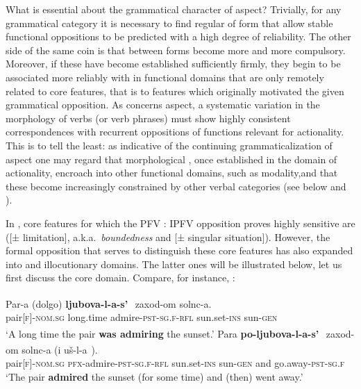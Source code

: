 \documentclass[output=paper]{langsci/langscibook}
\begin{document}
What is essential about the grammatical character of aspect? Trivially, for any grammatical category it is necessary to find regular  of form that allow stable functional oppositions to be predicted with a high degree of reliability. The other side of the same coin is that  between forms become more and more compulsory. Moreover, if these  have become established sufficiently firmly, they begin to be associated more reliably with  in functional domains that are only remotely related to core features, that is to features which originally motivated the given grammatical opposition. As concerns aspect, a systematic variation in the morphology of verbs (or verb phrases) must show highly consistent correspondences with recurrent oppositions of functions relevant for actionality. This is to tell the least: as indicative of the continuing grammaticalization of aspect  one may regard that morphological , once established in the domain of actionality, encroach into other functional domains, such as modality,\largerpage and that these  become increasingly constrained by other verbal categories (see below and ).

In , core features for which the PFV : IPFV opposition proves highly sensitive are ([± limitation], a.k.a.\ \textit{boundedness} and [± singular situation]). However, the formal opposition that serves to distinguish these core features has also expanded into  and illocutionary domains. The latter ones will be illustrated below, let us first discuss the core domain. Compare, for instance, :

\ea \label{ex:wiemerserzant:1}
\ea 
\gll Par-a                (dolgo) \textbf{ljubova-l-a-s’}{\textsuperscript{~}\IPFV}   zaxod-om             solnc-a.\\
pair\textsc{[f]-nom.sg}   long.time  admire-\textsc{pst-sg.f-rfl}  sun.set\textsc{-ins} sun-\textsc{gen}\\
\glt ‘A long time the pair \textbf{was admiring} the sunset.’
\ex  
\gll Para \textbf{po-ljubova-l-a-s’}{\textsuperscript{~}\PFV} zaxod-om solnc-a     (i     uš-l-a{\textsuperscript{~}\PFV}).\\
pair\textsc{[f]-nom.sg}    \textsc{pfx}-admire-\textsc{pst-sg.f-rfl}    sun.set-\textsc{ins}   sun-\textsc{gen}  and  go.away-\textsc{pst-sg.f}\\
\glt ‘The pair \textbf{admired} the sunset (for some time) and (then) went away.’
\z 
\z 
\end{document}
